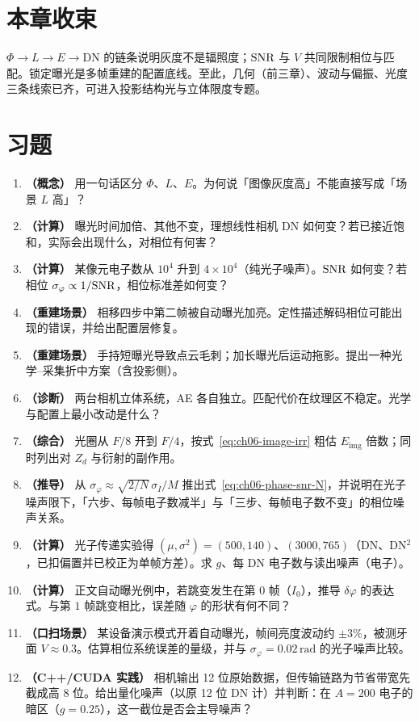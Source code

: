 \section*{本章收束}
$\Phi\to L\to E\to\mathrm{DN}$ 的链条说明灰度不是辐照度；$\mathrm{SNR}$ 与 $V$ 共同限制相位与匹配。锁定曝光是多帧重建的配置底线。至此，几何（前三章）、波动与偏振、光度三条线索已齐，可进入投影结构光与立体限度专题。

\section{习题}
\label{sec:ch05-exercises}

\begin{enumerate}
  \item \textbf{（概念）} 用一句话区分 $\Phi$、$L$、$E$。为何说「图像灰度高」不能直接写成「场景 $L$ 高」？
  \item \textbf{（计算）} 曝光时间加倍、其他不变，理想线性相机 DN 如何变？若已接近饱和，实际会出现什么，对相位有何害？
  \item \textbf{（计算）} 某像元电子数从 $10^{4}$ 升到 $4\times10^{4}$（纯光子噪声）。$\mathrm{SNR}$ 如何变？若相位 $\sigma_{\varphi}\propto1/\mathrm{SNR}$，相位标准差如何变？
  \item \textbf{（重建场景）} 相移四步中第二帧被自动曝光加亮。定性描述解码相位可能出现的错误，并给出配置层修复。
  \item \textbf{（重建场景）} 手持短曝光导致点云毛刺；加长曝光后运动拖影。提出一种光学–采集折中方案（含投影侧）。
  \item \textbf{（诊断）} 两台相机立体系统，AE 各自独立。匹配代价在纹理区不稳定。光学与配置上最小改动是什么？
  \item \textbf{（综合）} 光圈从 $F/8$ 开到 $F/4$，按式~\eqref{eq:ch06-image-irr} 粗估 $E_{\mathrm{img}}$ 倍数；同时列出对 $Z_d$ 与衍射的副作用。
  \item \textbf{（推导）} 从 $\sigma_\varphi\approx\sqrt{2/N}\,\sigma_I/M$ 推出式~\eqref{eq:ch06-phase-snr-N}，并说明在光子噪声限下，「六步、每帧电子数减半」与「三步、每帧电子数不变」的相位噪声关系。
  \item \textbf{（计算）} 光子传递实验得 $(\mu,\sigma^2)=(500,140)$、$(3000,765)$（DN、DN$^2$，已扣偏置并已校正为单帧方差）。求 $g$、每 DN 电子数与读出噪声（电子）。
  \item \textbf{（计算）} 正文自动曝光例中，若跳变发生在第 $0$ 帧（$I_0$），推导 $\delta\varphi$ 的表达式。与第 $1$ 帧跳变相比，误差随 $\varphi$ 的形状有何不同？
  \item \textbf{（口扫场景）} 某设备演示模式开着自动曝光，帧间亮度波动约 $\pm3\%$，被测牙面 $V\approx0.3$。估算相位系统误差的量级，并与 $\sigma_\varphi=0.02\,\mathrm{rad}$ 的光子噪声比较。
  \item \textbf{（C++/CUDA 实践）} 相机输出 12 位原始数据，但传输链路为节省带宽先截成高 8 位。给出量化噪声（以原 12 位 DN 计）并判断：在 $A=200$ 电子的暗区（$g=0.25$），这一截位是否会主导噪声？
\end{enumerate}

